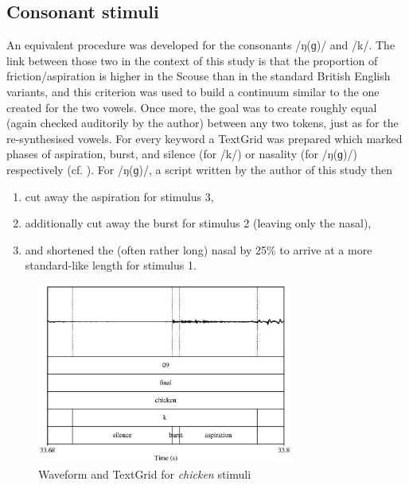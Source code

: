\subsection{Consonant stimuli}\label{sec.perc_method.con}

An equivalent procedure was developed for the consonants /ŋ(ɡ)/ and /k/.
The link between those two in the context of this study is that the proportion of friction/aspiration is higher in the Scouse than in the standard British English variants, and this criterion was used to build a continuum similar to the one created for the two vowels.
Once more, the goal was to create roughly equal  (again checked auditorily by the author) between any two tokens, just as for the re-synthesised vowels.
For every keyword a TextGrid was prepared which marked phases of aspiration, burst, and silence (for /k/) or nasality (for /ŋ(ɡ)/) respectively (cf. ).
For /ŋ(ɡ)/, a script written by the author of this study then

\begin{enumerate}
	\item cut away the aspiration for stimulus 3,
	\item additionally cut away the burst for stimulus 2 (leaving only the nasal),
	\item and shortened the (often rather long) nasal by 25\% to arrive at a more standard-like length for stimulus 1.
\end{enumerate}

\begin{figure}
	
	\includegraphics[width=0.75\textwidth]{./figures/chicken_spectrogram}
	\caption{Waveform and TextGrid for \emph{chicken} stimuli}
	\label{fig.chicken.spec}
\end{figure}

